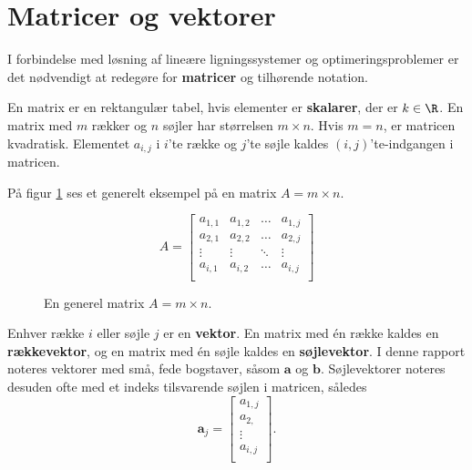 \section{Matricer og vektorer}
%  
%
I forbindelse med løsning af lineære ligningssystemer og optimeringsproblemer er det nødvendigt at redegøre for \textbf{matricer} og tilhørende notation. 
%
\begin{defn}{}{}
En matrix er en rektangulær tabel, hvis elementer er \textbf{skalarer}, der er $k \in \R$. 
En matrix med $m$ rækker og $n$ søjler har størrelsen $m \times n$.
Hvis $m=n$, er matricen kvadratisk. 
Elementet $a_{i,j}$ i $i$'te række og $j$'te søjle kaldes $(i,j)$'te-indgangen i matricen. 
\end{defn}
\noindent
%
På figur \ref{fig:matrix_gen_eks} ses et generelt eksempel på en matrix $A = m \times n$.
%
\begin{figure}[H]
	\begin{center}
$$
A=
\begin{bmatrix}
a_{1,1} & a_{1,2} & \ldots & a_{1,j} \\
a_{2,1} & a_{2,2} & \ldots & a_{2,j} \\
\vdots  & \vdots  & \ddots & \vdots \\
a_{i,1} & a_{i,2} & \ldots & a_{i,j} \\
\end{bmatrix}
$$
	\end{center}
	\caption{En generel matrix $A=m \times n$.}
	\label{fig:matrix_gen_eks}
\end{figure}
\noindent
%
Enhver række $i$ eller søjle $j$ er en \textbf{vektor}. 
En matrix med én række kaldes en \textbf{rækkevektor}, og en matrix med én søjle kaldes en \textbf{søjlevektor}. 
I denne rapport noteres vektorer med små, fede bogstaver, såsom $\textbf{a}$ og $\textbf{b}$. 
Søjlevektorer noteres desuden ofte med et indeks tilsvarende søjlen i matricen, således 
%
$$
\textbf{a}_j= 
\begin{bmatrix}
a_{1,j} \\
a_{2,} \\
\vdots \\
a_{i,j} \\
\end{bmatrix}.
$$ 